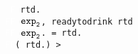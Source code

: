\begin{figure}[H]
    \texttt{
    \textcolor{white}{F} rtd. \\
    \textcolor{white}{FF} $\texttt{exp}\sb\texttt{2}$, readytodrink rtd\\
    \textcolor{white}{FF} $\texttt{exp}\sb\texttt{2}$. = rtd.\\
    \textcolor{white}{FF}(  rtd.) > 
    }
\end{figure}
